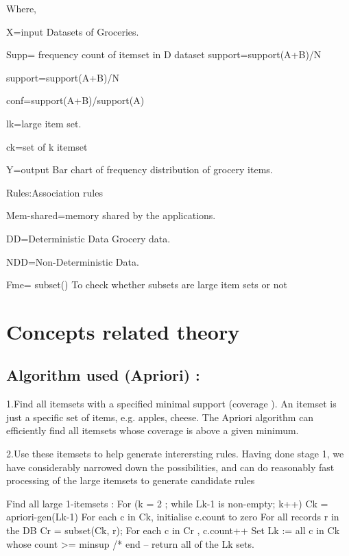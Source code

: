 \documentclass[10pt,a4paper]{article}
\begin{document}
{\rmfamily
	Where,}

{\rmfamily
	X=input
	Datasets of Groceries.
	}

{\rmfamily
	Supp= frequency count of itemset in D dataset
	support=support(A+B)/N
	}

{\rmfamily
	support=support(A+B)/N
}

{\rmfamily
	conf=support(A+B)/support(A)
	
{\rmfamily
lk=large item set.	
	}
	
	{\rmfamily
		ck=set of k itemset
	}
	
	{\rmfamily
Y=output
Bar chart of frequency distribution of grocery items.

	{\rmfamily
	
 Rules:Association rules
 
}
{\rmfamily
		Mem-shared=memory shared by the applications.}
	
{\rmfamily
		DD=Deterministic Data
		Grocery data.
}
	
	{\rmfamily
NDD=Non-Deterministic Data.}

{\rmfamily
Fme= subset()
To check whether subsets are large item sets or not
}

\section{Concepts related theory}
\subsection{Algorithm used (Apriori) : }

  1.Find all itemsets with a specified minimal support  (coverage ).
\newline 
An itemset is just a specific set of items, e.g. {apples, cheese}. The Apriori algorithm can efficiently find all itemsets whose coverage is above a given minimum.

2.Use these itemsets to help generate interersting rules.
\newline
Having done stage 1, we have considerably narrowed down the possibilities, and can do reasonably fast processing of the large itemsets to generate candidate rules

Find all large 1-itemsets
:  For (k = 2 ; while Lk-1 is non-empty; k++)
		{Ck = apriori-gen(Lk-1)
          For each c in Ck, initialise c.count to zero 
          For all records r in the DB
	{Cr = subset(Ck, r);  For each c in Cr , c.count++ }
             Set Lk := all c in Ck whose count >=  minsup
         }  /*  end   -- return all of the Lk sets.

}}
\end{document}
